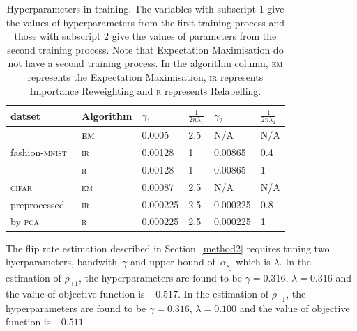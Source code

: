 \documentclass[12pt]{article} %
\newcommand{\rhoo}{\rho_{+1}}
\newcommand{\rhoz}{\rho_{-1}}
\newcommand{\mnist}{fashion-\textsc{mnist}}
\begin{document}
\begin{table}[h]
	\caption{Hyperparameters in training. The variables with subscript $1$ give the values of hyperparameters from the first training process and those with subscript $2$ give the values of parameters from the second training process. Note that Expectation Maximisation do not have a second training process. In the algorithm column, \textsc{em} represents the Expectation Maximisation, \textsc{ir} represents Importance Reweighting and \textsc{r} represents Relabelling.}
	\label{tab:hyperparameter}
\centering
\begin{tabular}{@{}llllll@{}}
\toprule
datset& Algorithm&$\gamma_{1}$  &$\frac{1}{2n\lambda_{1}}$ &$\gamma_{2}$  & $\frac{1}{2n\lambda_{2}}$ \\ \midrule
&$\textsc{em}$&0.0005 &2.5              & N/A     & N/A \\
\mnist\ &\textsc{ir}& 0.00128  & 1              & 0.00865    & 0.4\\
 & \textsc{r}& 0.00128 & 1             & 0.00865     & 1\\
\midrule
\textsc{cifar}&\textsc{em}&0.00087 & 2.5              & N/A     & N/A\\
 preprocessed&\textsc{ir}&0.000225 & 2.5              & 0.000225    & 0.8\\
 by \textsc{pca}  &\textsc{r}&0.000225 & 2.5           & 0.000225     & 1\\ 
\bottomrule
\end{tabular}
\end{table}
The flip rate estimation described in Section~\ref{method2} requires tuning two hyerparameters, bandwith~$\gamma$ and upper bound of~$\alpha_{s_j}$ which is $\lambda$. In the estimation of $\rhoo$, the hyperparameters are found to be $\gamma=0.316$, $\lambda=0.316$ and the value of objective function is $-0.517$. In the estimation of $\rhoz$, the hyperparameters are found to be $\gamma=0.316$, $\lambda=0.100$ and the value of objective function is $-0.511$
\end{document}
